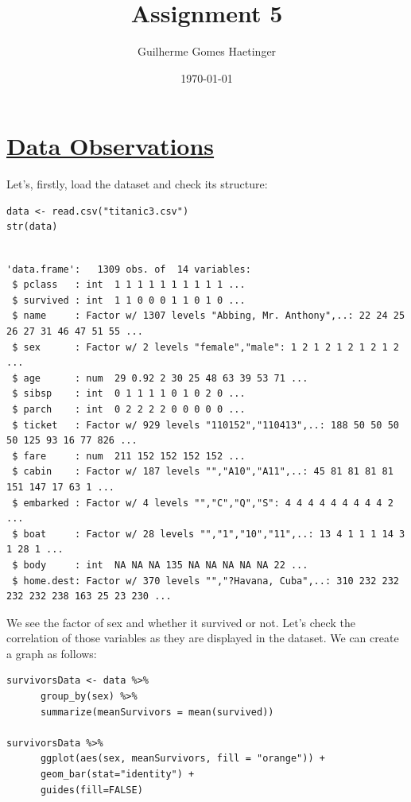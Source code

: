 \documentclass[11pt]{article}
\author{Guilherme Gomes Haetinger}
\date{\today}
\title{Assignment 5}
\begin{document}
\maketitle
\thispagestyle{empty}


\section{\underline{Data Observations}}
\label{sec:org8033d7f}

Let's, firstly, load the dataset and check its structure:

\begin{verbatim}
data <- read.csv("titanic3.csv")
str(data)
\end{verbatim}

\begin{verbatim}

'data.frame':	1309 obs. of  14 variables:
 $ pclass   : int  1 1 1 1 1 1 1 1 1 1 ...
 $ survived : int  1 1 0 0 0 1 1 0 1 0 ...
 $ name     : Factor w/ 1307 levels "Abbing, Mr. Anthony",..: 22 24 25 26 27 31 46 47 51 55 ...
 $ sex      : Factor w/ 2 levels "female","male": 1 2 1 2 1 2 1 2 1 2 ...
 $ age      : num  29 0.92 2 30 25 48 63 39 53 71 ...
 $ sibsp    : int  0 1 1 1 1 0 1 0 2 0 ...
 $ parch    : int  0 2 2 2 2 0 0 0 0 0 ...
 $ ticket   : Factor w/ 929 levels "110152","110413",..: 188 50 50 50 50 125 93 16 77 826 ...
 $ fare     : num  211 152 152 152 152 ...
 $ cabin    : Factor w/ 187 levels "","A10","A11",..: 45 81 81 81 81 151 147 17 63 1 ...
 $ embarked : Factor w/ 4 levels "","C","Q","S": 4 4 4 4 4 4 4 4 4 2 ...
 $ boat     : Factor w/ 28 levels "","1","10","11",..: 13 4 1 1 1 14 3 1 28 1 ...
 $ body     : int  NA NA NA 135 NA NA NA NA NA 22 ...
 $ home.dest: Factor w/ 370 levels "","?Havana, Cuba",..: 310 232 232 232 232 238 163 25 23 230 ...
\end{verbatim}

We see the factor of sex and whether it survived or not. Let's check the correlation of those variables as they are displayed in the dataset. We can create a graph as follows:

\begin{verbatim}
survivorsData <- data %>%
      group_by(sex) %>%
      summarize(meanSurvivors = mean(survived))

survivorsData %>%
      ggplot(aes(sex, meanSurvivors, fill = "orange")) +
      geom_bar(stat="identity") +
      guides(fill=FALSE)
\end{verbatim}
\end{document}
